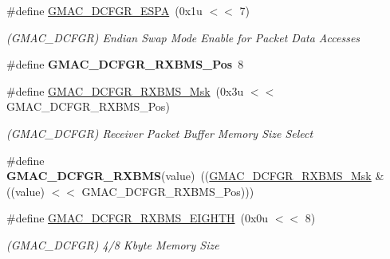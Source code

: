 \begin{DoxyCompactItemize}
\#define \mbox{\hyperlink{group__SAMV71__GMAC_ga27eb39d9c03abd7ee291fe0a2a4cf9d7}{G\+M\+A\+C\+\_\+\+D\+C\+F\+G\+R\+\_\+\+E\+S\+PA}}~(0x1u $<$$<$ 7)
\begin{DoxyCompactList}\small\item\em (G\+M\+A\+C\+\_\+\+D\+C\+F\+GR) Endian Swap Mode Enable for Packet Data Accesses \end{DoxyCompactList}\item 
\mbox{\label{group__SAMV71__GMAC_ga09adf3c431b3e80acc442b579f979cb5}} 
\#define {\bfseries G\+M\+A\+C\+\_\+\+D\+C\+F\+G\+R\+\_\+\+R\+X\+B\+M\+S\+\_\+\+Pos}~8
\item 
\mbox{\label{group__SAMV71__GMAC_gafb3005bef900da397d6acc32ebc641d4}} 
\#define \mbox{\hyperlink{group__SAMV71__GMAC_gafb3005bef900da397d6acc32ebc641d4}{G\+M\+A\+C\+\_\+\+D\+C\+F\+G\+R\+\_\+\+R\+X\+B\+M\+S\+\_\+\+Msk}}~(0x3u $<$$<$ G\+M\+A\+C\+\_\+\+D\+C\+F\+G\+R\+\_\+\+R\+X\+B\+M\+S\+\_\+\+Pos)
\begin{DoxyCompactList}\small\item\em (G\+M\+A\+C\+\_\+\+D\+C\+F\+GR) Receiver Packet Buffer Memory Size Select \end{DoxyCompactList}\item 
\mbox{\label{group__SAMV71__GMAC_ga444400e6e7bddaa54d53a6a2150a52e9}} 
\#define {\bfseries G\+M\+A\+C\+\_\+\+D\+C\+F\+G\+R\+\_\+\+R\+X\+B\+MS}(value)~((\mbox{\hyperlink{group__SAMV71__GMAC_gafb3005bef900da397d6acc32ebc641d4}{G\+M\+A\+C\+\_\+\+D\+C\+F\+G\+R\+\_\+\+R\+X\+B\+M\+S\+\_\+\+Msk}} \& ((value) $<$$<$ G\+M\+A\+C\+\_\+\+D\+C\+F\+G\+R\+\_\+\+R\+X\+B\+M\+S\+\_\+\+Pos)))
\item 
\mbox{\label{group__SAMV71__GMAC_ga2e15d6d5c9c2202b80eddc0894d44053}} 
\#define \mbox{\hyperlink{group__SAMV71__GMAC_ga2e15d6d5c9c2202b80eddc0894d44053}{G\+M\+A\+C\+\_\+\+D\+C\+F\+G\+R\+\_\+\+R\+X\+B\+M\+S\+\_\+\+E\+I\+G\+H\+TH}}~(0x0u $<$$<$ 8)
\begin{DoxyCompactList}\small\item\em (G\+M\+A\+C\+\_\+\+D\+C\+F\+GR) 4/8 Kbyte Memory Size \end{DoxyCompactList}\item 
\mbox{\label{group__SAMV71__GMAC_gafba34868045ec08fa21e3e99c91edb6f}} 

\end{DoxyCompactItemize}
